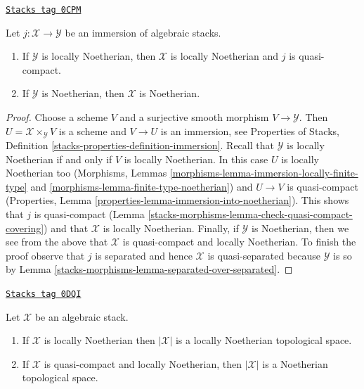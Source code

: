 \begin{lemma}
\label{stacks-morphisms-lemma-locally-closed-in-noetherian}
\href{https://stacks.math.columbia.edu/tag/0CPM}{\texttt{Stacks tag 0CPM}}

Let $j : \mathcal{X} \to \mathcal{Y}$ be an immersion of algebraic stacks.
\begin{enumerate}
\item If $\mathcal{Y}$ is locally Noetherian, then
$\mathcal{X}$ is locally Noetherian and $j$ is quasi-compact.
\item If $\mathcal{Y}$ is Noetherian, then $\mathcal{X}$ is Noetherian.
\end{enumerate}
\end{lemma}

\begin{proof}
Choose a scheme $V$ and a surjective smooth morphism $V \to \mathcal{Y}$.
Then $U = \mathcal{X} \times_\mathcal{Y} V$ is a scheme and
$V \to U$ is an immersion, see
Properties of Stacks, Definition \ref{stacks-properties-definition-immersion}.
Recall that $\mathcal{Y}$ is locally Noetherian if and only if $V$
is locally Noetherian. In this case $U$ is locally Noetherian too
(Morphisms, Lemmas \ref{morphisms-lemma-immersion-locally-finite-type} and
\ref{morphisms-lemma-finite-type-noetherian}) and $U \to V$ is quasi-compact
(Properties, Lemma \ref{properties-lemma-immersion-into-noetherian}).
This shows that $j$ is quasi-compact
(Lemma \ref{stacks-morphisms-lemma-check-quasi-compact-covering})
and that $\mathcal{X}$ is locally Noetherian.
Finally, if $\mathcal{Y}$ is Noetherian, then we see from the above
that $\mathcal{X}$ is quasi-compact and locally Noetherian.
To finish the proof observe that $j$ is separated and hence
$\mathcal{X}$ is quasi-separated because $\mathcal{Y}$ is so by
Lemma \ref{stacks-morphisms-lemma-separated-over-separated}.
\end{proof}

\begin{lemma}
\label{stacks-morphisms-lemma-Noetherian-topology}
\href{https://stacks.math.columbia.edu/tag/0DQI}{\texttt{Stacks tag 0DQI}}

Let $\mathcal{X}$ be an algebraic stack.
\begin{enumerate}
\item If $\mathcal{X}$ is locally Noetherian then $|\mathcal{X}|$
is a locally Noetherian topological space.
\item If $\mathcal{X}$ is quasi-compact and locally Noetherian, then
$|\mathcal{X}|$ is a Noetherian topological space.
\end{enumerate}
\end{lemma}

